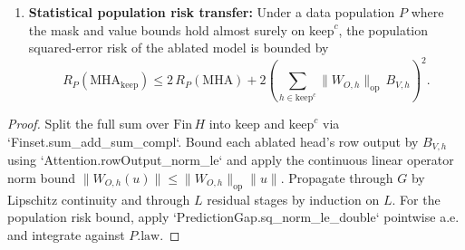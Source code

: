 \begin{lemma}
\begin{enumerate}
\item \textbf{Statistical population risk transfer:} Under a data population $P$ where the mask and value bounds hold almost surely on $\mathrm{keep}^c$, the population squared-error risk of the ablated model is bounded by
\[
R_P(\mathrm{MHA}_{\mathrm{keep}}) \le 2\,R_P(\mathrm{MHA}) + 2\left(\sum_{h\in\mathrm{keep}^c} \|W_{O,h}\|_{\mathrm{op}}\,B_{V,h}\right)^2.
\]
\end{enumerate}
\end{lemma}
\begin{proof}
\leanok
Split the full sum over $\mathrm{Fin}\,H$ into $\mathrm{keep}$ and $\mathrm{keep}^c$ via `Finset.sum_add_sum_compl`. Bound each ablated head's row output by $B_{V,h}$ using `Attention.rowOutput_norm_le` and apply the continuous linear operator norm bound $\|W_{O,h}(u)\| \le \|W_{O,h}\|_{\mathrm{op}}\|u\|$. Propagate through $G$ by Lipschitz continuity and through $L$ residual stages by induction on $L$. For the population risk bound, apply `PredictionGap.sq_norm_le_double` pointwise a.e. and integrate against $P.\mathrm{law}$.
\end{proof}

